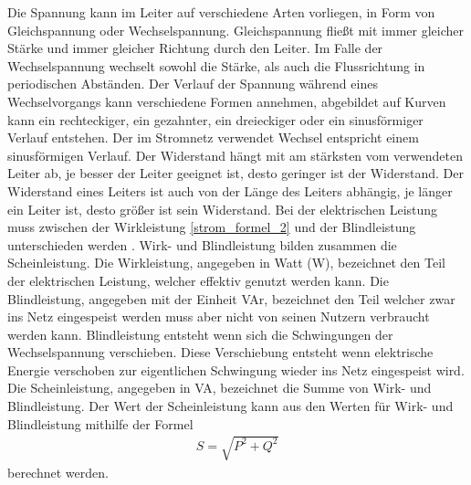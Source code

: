 Die Spannung kann im Leiter auf verschiedene Arten vorliegen, in Form von Gleichspannung oder Wechselspannung. Gleichspannung fließt mit immer gleicher Stärke und immer gleicher Richtung durch den Leiter. Im Falle der Wechselspannung wechselt sowohl die Stärke, als auch die Flussrichtung in periodischen Abständen. Der Verlauf der Spannung während eines Wechselvorgangs kann verschiedene Formen annehmen, abgebildet auf Kurven kann ein rechteckiger, ein gezahnter, ein dreieckiger oder ein sinusförmiger Verlauf entstehen. Der im Stromnetz verwendet Wechsel entspricht einem sinusförmigen Verlauf. Der Widerstand hängt mit am stärksten vom verwendeten Leiter ab, je besser der Leiter geeignet ist, desto geringer ist der Widerstand. Der Widerstand eines Leiters ist auch von der Länge des Leiters abhängig, je länger ein Leiter ist, desto größer ist sein Widerstand. Bei der elektrischen Leistung muss zwischen der Wirkleistung \ref{strom_formel_2} und der Blindleistung unterschieden werden \cite{strom_leistung}. Wirk- und Blindleistung bilden zusammen die Scheinleistung. Die Wirkleistung, angegeben in Watt (W), bezeichnet den Teil der elektrischen Leistung, welcher effektiv genutzt werden kann. Die Blindleistung, angegeben mit der Einheit VAr, bezeichnet den Teil welcher zwar ins Netz eingespeist werden muss aber nicht von seinen Nutzern verbraucht werden kann. Blindleistung entsteht wenn sich die Schwingungen der Wechselspannung verschieben. Diese Verschiebung entsteht wenn elektrische Energie verschoben zur eigentlichen Schwingung wieder ins Netz eingespeist wird. Die Scheinleistung, angegeben in VA, bezeichnet die Summe von Wirk- und Blindleistung. Der Wert der Scheinleistung kann aus den Werten für Wirk- und Blindleistung mithilfe der Formel
\begin{align}
	S = \sqrt{P^{2}+Q^{2}}
	\label{strom_formel_3}
\end{align}
berechnet werden.

